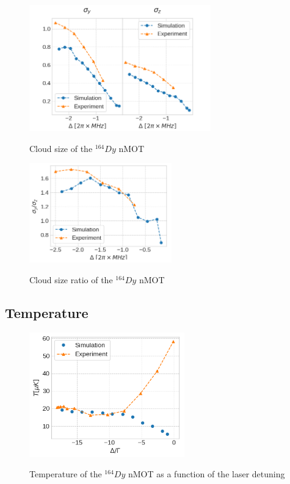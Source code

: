 \begin{figure}[!ht]
    \centering
    \caption{Cloud size of the ${}^{164}Dy$ nMOT}
    \includegraphics[width=0.7\textwidth]{USPSC-img/dy_cloud_size.png}
    \vspace{5px}
    \label{fig:dy-cloud-size}
\end{figure}

\begin{figure}[!ht]
    \centering
    \caption{Cloud size ratio of the ${}^{164}Dy$ nMOT}
    \includegraphics[width=0.55\textwidth]{USPSC-img/dy_cloud_size_ratio.png}
    \vspace{5px}
    \label{fig:dy-cloud-size-ratio}
\end{figure}

\subsection{Temperature}
\label{temperature}

\begin{figure}[!ht]
    \centering
    \caption{Temperature of the ${}^{164}Dy$ nMOT as a function of the laser detuning}
    \includegraphics[width=0.6\textwidth]{USPSC-img/dy_temperature.png}
    \vspace{5px}
    \label{fig:dy-temperature}
\end{figure}
